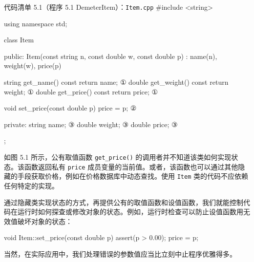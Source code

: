 \begin{codeboxt}{代码清单 5.1（程序 5.1 DemeterItem）：\texttt{Item.cpp}}
#include <string>

using namespace std;

class Item
{
public:
    Item(const string n, const double w, const double p)
        : name(n), weight(w), price(p) {}

    string get_name()   const { return name; }        ①
    double get_weight() const { return weight; }      ①
    double get_price()  const { return price; }       ①

    void set_price(const double p) { price = p; }     ②

private:
    string name;                                      ③
    double weight;                                    ③
    double price;                                     ③
};
\end{codeboxt}
\par
{}\par
{}\par

如图 5.1 所示，公有取值函数 \texttt{get\_\allowbreak{}price(\allowbreak{})\allowbreak{}} 的调用者并不知道该类如何实现状态。该函数返回私有 \texttt{price} 成员变量的当前值。或者，该函数也可以通过其他隐藏的手段获取价格，例如在价格数据库中动态查找。使用 \texttt{Item} 类的代码不应依赖任何特定的实现。


通过隐藏类实现状态的方式，再提供公有的取值函数和设值函数，我们就能控制代码在运行时如何探查或修改对象的状态。例如，运行时检查可以防止设值函数用无效值破坏对象的状态：

\begin{codebox}
    void Item::set_price(const double p)
    {
        assert(p > 0.00);
        price = p;
    }
\end{codebox}


当然，在实际应用中，我们处理错误的参数值应当比立刻中止程序优雅得多。

